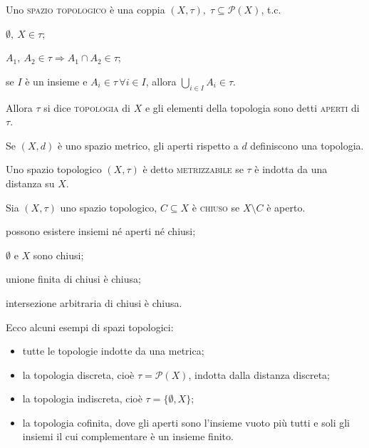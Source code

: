 \begin{defn}
    Uno \textsc{spazio topologico} è una coppia $(X, \tau),\; {\tau \subseteq
    \mathcal{P}(X)}$, t.c.
    \begin{nlist}
        \item $\emptyset,\ X \in \tau$;
        \item $A_1,\ A_2 \in \tau \Rightarrow A_1 \cap A_2 \in \tau$;
        \item se $I$ è un insieme e $A_i \in \tau \, \forall i \in I$, allora
        $\displaystyle \bigcup_{i \in I} A_i \in \tau$.
    \end{nlist}
    Allora $\tau$ si dice \textsc{topologia} di $X$ e gli elementi della
    topologia sono detti \textsc{aperti} di $\tau$.
\end{defn}

\begin{prop}
    Se $(X, d)$ è uno spazio metrico, gli aperti rispetto a $d$ definiscono una
    topologia.
\end{prop}

\begin{defn}
    Uno spazio topologico $(X, \tau)$ è detto \textsc{metrizzabile} se $\tau$ è
    indotta da una distanza su $X$.
\end{defn}

\begin{defn}
    Sia $(X, \tau)$ uno spazio topologico, $C \subseteq X$ è \textsc{chiuso} se
    $X \setminus C$ è aperto.
\end{defn}

\begin{oss}
\begin{nlist}
\item possono esistere insiemi né aperti né chiusi;
\item $\emptyset$ e $X$ sono chiusi;
\item unione finita di chiusi è chiusa;
\item intersezione arbitraria di chiusi è chiusa.
\end{nlist}
\end{oss}

\begin{ex}
    Ecco alcuni esempi di spazi topologici:
    \begin{itemize}
        \item tutte le topologie indotte da una metrica;
        \item la topologia discreta, cioè $\tau=\mathcal{P}(X)$, indotta dalla
        distanza discreta;
        \item la topologia indiscreta, cioè $\tau=\{ \emptyset, X \}$;
        \item la topologia cofinita, dove gli aperti sono l'insieme vuoto più
        tutti e soli gli insiemi il cui complementare è un insieme finito.
    \end{itemize}
\end{ex}

